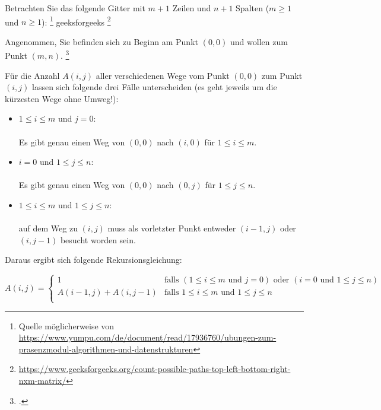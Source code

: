 \documentclass{bschlangaul-aufgabe}
\begin{document}

Betrachten Sie das folgende Gitter mit $m + 1$ Zeilen und $n + 1$
Spalten ($m \geq 1$ und $n \geq 1$):
\footnote{Quelle möglicherweise von \url{https://www.yumpu.com/de/document/read/17936760/ubungen-zum-prasenzmodul-algorithmen-und-datenstrukturen}}
geeksforgeeks
\footnote{\url{https://www.geeksforgeeks.org/count-possible-paths-top-left-bottom-right-nxm-matrix/}}

Angenommen, Sie befinden sich zu Beginn am Punkt $(0, 0)$ und wollen zum
Punkt $(m, n)$.
\footcite[Seite 1, Dynamische Programmierung, Aufgabe 2]{aud:ab:3}

Für die Anzahl $A(i, j)$ aller verschiedenen Wege vom Punkt $(0, 0)$ zum
Punkt $(i, j)$ lassen sich folgende drei Fälle unterscheiden (es geht
jeweils um die kürzesten Wege
ohne Umweg!):

\begin{itemize}
\item $1 \leq i \leq m$ und $j = 0$:\\\\
Es gibt genau einen Weg von $(0, 0)$ nach $(i, 0)$ für
$1 \leq i \leq m$.

\item $i = 0$ und $1 \leq j \leq n$:\\\\
Es gibt genau einen Weg von $(0, 0)$ nach $(0, j)$ für
$1 \leq j \leq n$.

\item $1 \leq i \leq m$ und $1 \leq j \leq n$:\\\\
auf dem Weg zu $(i, j)$
muss als vorletzter Punkt entweder $(i-1, j)$ oder $(i, j-1)$ besucht
worden sein.
\end{itemize}

\noindent
Daraus ergibt sich folgende Rekursionsgleichung:

\begin{equation*}
A(i, j) =
\begin{cases}
1 &
\text{falls }
(1 \leq i \leq m \text{ und } j = 0) \text{ oder }
(i = 0 \text{ und } 1 \leq j \leq n) \\

A(i - 1, j) + A(i, j - 1) &
\text{falls }
1 \leq i \leq m \text{ und }
1 \leq j \leq n \\
\end{cases}
\end{equation*}
\end{document}
